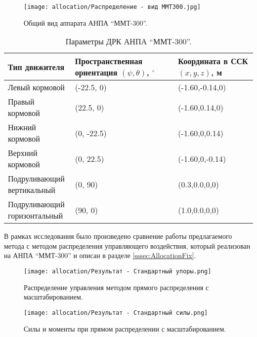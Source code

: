 \begin{figure}[ht]
    \centering
    \texttt{[image: allocation/Распределение - вид ММТ300.jpg]}
    \caption{Общий вид аппарата АНПА ``ММТ-300''.}
    \label{fig:mmt-300}
\end{figure}

\begin{table}
    \caption{Параметры ДРК АНПА ``ММТ-300''.}
    \label{tab:mmt300_propulsion}
    \centering
    \begin{tabular}{lll}
        \toprule
        Тип движителя & \makecell[l]{Пространственная ориентация \\ $(\psi, \theta)$, $^{\circ}$} & \makecell[l]{Координата в ССК \\ 
        $(x,y,z)$, м} \\
        \midrule
        Левый   кормовой & (-22.5, 0) & (-1.60,-0.14,0) \\
        Правый  кормовой & (22.5, 0)  & (-1.60,0.14,0) \\
        Нижний  кормовой & (0, -22.5) & (-1.60,0,0.14) \\
        Верхний кормовой & (0, 22.5)  & (-1.60,0,-0.14) \\
        \makecell[l]{Подруливающий \\ вертикальный}   & (0, 90) & (0.3,0.0,0,0) \\
        \makecell[l]{Подруливающий \\ горизонтальный} & (90, 0) & (1.0,0.0,0,0) \\
        \bottomrule
    \end{tabular}
\end{table}

В рамках исследования было произведено сравнение работы предлагаемого метода с методом распределения управляющего воздействия, который реализован на АНПА ``ММТ-300'' и описан в разделе \ref{sssec:AllocationFix}.

\begin{figure}[ht]
    \centering
    \texttt{[image: allocation/Результат - Стандартный упоры.png]}
    \caption{Распределение управления методом прямого распределения с масштабированием.}
    \label{fig:mmt-300-allocation-fix-thrust}
\end{figure}

\begin{figure}[ht]
    \centering
    \texttt{[image: allocation/Результат - Стандартный силы.png]}
    \caption{Силы и моменты при прямом распределении с масштабированием.}
    \label{fig:mmt-300-allocation-fix-force}
\end{figure}

